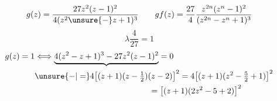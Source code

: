 \[
g(z)=\frac{27z^2(z-1)^2}{4(z^2\unsure{-}z+1)^3}
\qquad
gf(z)=\frac{27}{4}\frac{z^{2n}(z^n-1)^2}{(z^{2n}-z^n+1)^3}
\]
\[
\lambda\frac{4}{27}=1
\]
\[
\begin{aligned}
g(z)=1&\Longleftrightarrow
\underbrace{4(z^2-z+1)^3-27z^2(z-1)^2}=0\\
&\unsure{-|=}4\big[(z+1)(z-\tfrac12)(z-2)\big]^2=4\big[(z+1)(z^2-\tfrac52+1)\big]^2\\
&\hspace{14em}=\big[(z+1)(2z^2-5+2)\big]^2
\end{aligned}
\]
